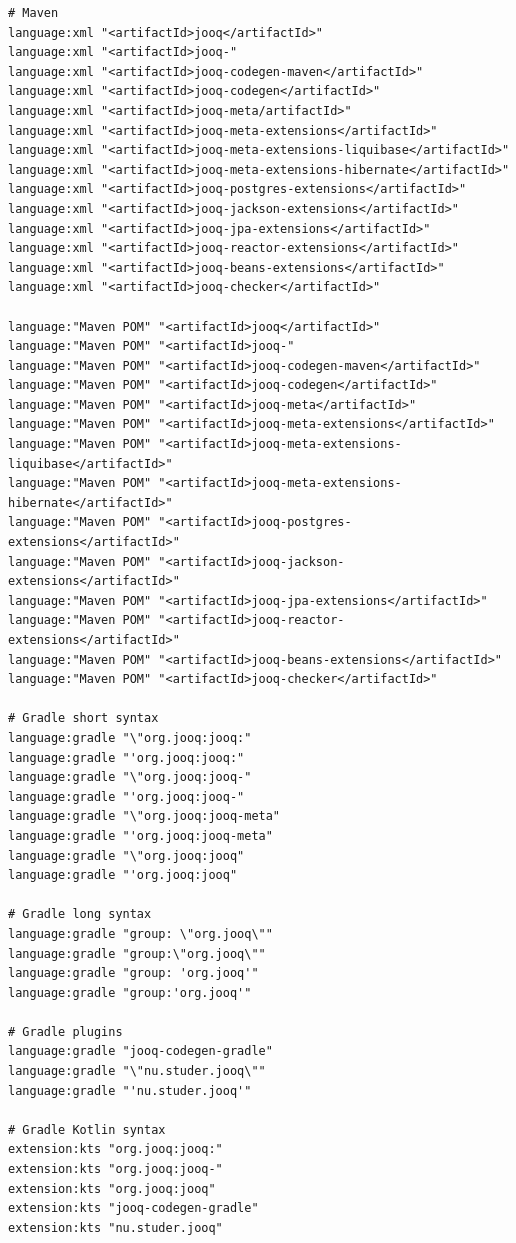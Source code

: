 \captionsetup{type=figure, list=no}
\begin{lstlisting}[frame=none, basicstyle=\small, breaklines=true, breakatwhitespace=false, breakindent=0pt]
# Maven
language:xml "<artifactId>jooq</artifactId>"
language:xml "<artifactId>jooq-"
language:xml "<artifactId>jooq-codegen-maven</artifactId>"
language:xml "<artifactId>jooq-codegen</artifactId>"
language:xml "<artifactId>jooq-meta/artifactId>"
language:xml "<artifactId>jooq-meta-extensions</artifactId>"
language:xml "<artifactId>jooq-meta-extensions-liquibase</artifactId>"
language:xml "<artifactId>jooq-meta-extensions-hibernate</artifactId>"
language:xml "<artifactId>jooq-postgres-extensions</artifactId>"
language:xml "<artifactId>jooq-jackson-extensions</artifactId>"
language:xml "<artifactId>jooq-jpa-extensions</artifactId>"
language:xml "<artifactId>jooq-reactor-extensions</artifactId>"
language:xml "<artifactId>jooq-beans-extensions</artifactId>"
language:xml "<artifactId>jooq-checker</artifactId>"

language:"Maven POM" "<artifactId>jooq</artifactId>"
language:"Maven POM" "<artifactId>jooq-"
language:"Maven POM" "<artifactId>jooq-codegen-maven</artifactId>"
language:"Maven POM" "<artifactId>jooq-codegen</artifactId>"
language:"Maven POM" "<artifactId>jooq-meta</artifactId>"
language:"Maven POM" "<artifactId>jooq-meta-extensions</artifactId>"
language:"Maven POM" "<artifactId>jooq-meta-extensions-liquibase</artifactId>"
language:"Maven POM" "<artifactId>jooq-meta-extensions-hibernate</artifactId>"
language:"Maven POM" "<artifactId>jooq-postgres-extensions</artifactId>"
language:"Maven POM" "<artifactId>jooq-jackson-extensions</artifactId>"
language:"Maven POM" "<artifactId>jooq-jpa-extensions</artifactId>"
language:"Maven POM" "<artifactId>jooq-reactor-extensions</artifactId>"
language:"Maven POM" "<artifactId>jooq-beans-extensions</artifactId>"
language:"Maven POM" "<artifactId>jooq-checker</artifactId>"

# Gradle short syntax
language:gradle "\"org.jooq:jooq:"
language:gradle "'org.jooq:jooq:"
language:gradle "\"org.jooq:jooq-"
language:gradle "'org.jooq:jooq-"
language:gradle "\"org.jooq:jooq-meta"
language:gradle "'org.jooq:jooq-meta"
language:gradle "\"org.jooq:jooq"
language:gradle "'org.jooq:jooq"

# Gradle long syntax
language:gradle "group: \"org.jooq\""
language:gradle "group:\"org.jooq\""
language:gradle "group: 'org.jooq'"
language:gradle "group:'org.jooq'"

# Gradle plugins
language:gradle "jooq-codegen-gradle"
language:gradle "\"nu.studer.jooq\""
language:gradle "'nu.studer.jooq'"

# Gradle Kotlin syntax
extension:kts "org.jooq:jooq:"
extension:kts "org.jooq:jooq-"
extension:kts "org.jooq:jooq"
extension:kts "jooq-codegen-gradle"
extension:kts "nu.studer.jooq"
\end{lstlisting}
\nopagebreak
\begin{minipage}{\linewidth}
\end{minipage}
